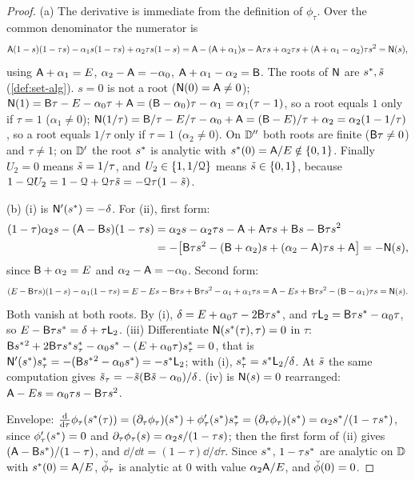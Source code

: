 \begin{proof}
(a) The derivative is immediate from the definition of $\phi_\tau$. Over the common denominator the numerator is
\[
\mathsf{A}(1-s)(1-\tau s)-\alpha_1s(1-\tau s)+\alpha_2\tau s(1-s)=\mathsf{A}-(\mathsf{A}+\alpha_1)s-\mathsf{A}\tau s+\alpha_2\tau s+(\mathsf{A}+\alpha_1-\alpha_2)\tau s^2=\mathsf{N}(s),
\]
using $\mathsf{A}+\alpha_1=E$, $\alpha_2-\mathsf{A}=-\alpha_0$, $\mathsf{A}+\alpha_1-\alpha_2=\mathsf{B}$. The roots of $\mathsf{N}$ are $s^{\ast},\tilde{s}$ (\cref{def:set-alg}). $s=0$ is not a root ($\mathsf{N}(0)=\mathsf{A}\neq0$); $\mathsf{N}(1)=\mathsf{B}\tau-E-\alpha_0\tau+\mathsf{A}=(\mathsf{B}-\alpha_0)\tau-\alpha_1=\alpha_1(\tau-1)$, so a root equals $1$ only if $\tau=1$ ($\alpha_1\neq0$); $\mathsf{N}(1/\tau)=\mathsf{B}/\tau-E/\tau-\alpha_0+\mathsf{A}=(\mathsf{B}-E)/\tau+\alpha_2=\alpha_2(1-1/\tau)$, so a root equals $1/\tau$ only if $\tau=1$ ($\alpha_2\neq0$). On $\mathbb{D}''$ both roots are finite ($\mathsf{B}\tau\neq0$) and $\tau\neq1$; on $\mathbb{D}'$ the root $s^{\ast}$ is analytic with $s^{\ast}(0)=\mathsf{A}/E\notin\{0,1\}$. Finally $U_2=0$ means $\tilde{s}=1/\tau$, and $U_2\in\{1,1/\mathcal{Q}\}$ means $\tilde{s}\in\{0,1\}$, because $1-\mathcal{Q} U_2=1-\mathcal{Q}+\mathcal{Q}\tau\tilde{s}=-\mathcal{Q}\tau(1-\tilde{s})$.

(b) (i) is $\mathsf{N}'(s^{\ast})=-\delta$. For (ii), first form:
\begin{align*}
(1-\tau)\alpha_2s-(\mathsf{A}-\mathsf{B} s)(1-\tau s)&=\alpha_2s-\alpha_2\tau s-\mathsf{A}+\mathsf{A}\tau s+\mathsf{B} s-\mathsf{B}\tau s^2\\
&=-\big[\mathsf{B}\tau s^2-(\mathsf{B}+\alpha_2)s+(\alpha_2-\mathsf{A})\tau s+\mathsf{A}\big]=-\mathsf{N}(s),
\end{align*}
since $\mathsf{B}+\alpha_2=E$ and $\alpha_2-\mathsf{A}=-\alpha_0$. Second form:
\[
(E-\mathsf{B}\tau s)(1-s)-\alpha_1(1-\tau s)=E-Es-\mathsf{B}\tau s+\mathsf{B}\tau s^2-\alpha_1+\alpha_1\tau s=\mathsf{A}-Es+\mathsf{B}\tau s^2-(\mathsf{B}-\alpha_1)\tau s=\mathsf{N}(s).
\]
Both vanish at both roots. By (i), $\delta=E+\alpha_0\tau-2\mathsf{B}\tau s^{\ast}$, and $\tau\mathsf{L}_2=\mathsf{B}\tau s^{\ast}-\alpha_0\tau$, so $E-\mathsf{B}\tau s^{\ast}=\delta+\tau\mathsf{L}_2$. (iii) Differentiate $\mathsf{N}(s^{\ast}(\tau),\tau)=0$ in $\tau$: $\mathsf{B}s^{\ast}{}^2+2\mathsf{B}\tau s^{\ast}s^{\ast}_\tau-\alpha_0s^{\ast}-(E+\alpha_0\tau)s^{\ast}_\tau=0$, that is $\mathsf{N}'(s^{\ast})s^{\ast}_\tau=-(\mathsf{B}s^{\ast}{}^2-\alpha_0s^{\ast})=-s^{\ast}\mathsf{L}_2$; with (i), $s^{\ast}_\tau=s^{\ast}\mathsf{L}_2/\delta$. At $\tilde{s}$ the same computation gives $\tilde{s}_\tau=-\tilde{s}(\mathsf{B}\tilde{s}-\alpha_0)/\delta$. (iv) is $\mathsf{N}(s)=0$ rearranged: $\mathsf{A}-Es=\alpha_0\tau s-\mathsf{B}\tau s^2$.

Envelope: $\frac{\mathrm{d}}{\mathrm{d}\tau}\phi_\tau(s^{\ast}(\tau))=(\partial_\tau\phi_\tau)(s^{\ast})+\phi_\tau'(s^{\ast})s^{\ast}_\tau=(\partial_\tau\phi_\tau)(s^{\ast})=\alpha_2s^{\ast}/(1-\tau s^{\ast})$, since $\phi'_\tau(s^{\ast})=0$ and $\partial_\tau\phi_\tau(s)=\alpha_2s/(1-\tau s)$; then the first form of (ii) gives $(\mathsf{A}-\mathsf{B}s^{\ast})/(1-\tau)$, and $\dd/\dd t=(1-\tau)\dd/\dd\tau$. Since $s^{\ast}$, $1-\tau s^{\ast}$ are analytic on $\mathbb{D}$ with $s^{\ast}(0)=\mathsf{A}/E$, $\breve{\phi}_\tau$ is analytic at $0$ with value $\alpha_2\mathsf{A}/E$, and $\breve{\phi}(0)=0$.
\end{proof}

